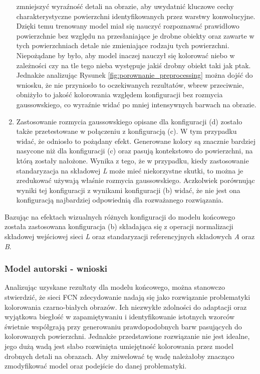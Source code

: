\begin{enumerate}[label=(\alph*)]
    zmniejszyć wyraźność detali na obrazie, aby uwydatnić kluczowe cechy charakterystyczne
    powierzchni identyfikowanych przez warstwy konwolucyjne. Dzięki temu trenowany
    model miał się nauczyć rozpoznawać prawidłowo powierzchnie bez względu na
    przesłaniające je drobne obiekty oraz zawarte w tych powierzchniach detale
    nie zmieniające rodzaju tych powierzchni. Niepożądane by było,
    aby model inaczej nauczył się kolorować niebo w zależności czy na tle tego
    nieba występuje jakiś drobny obiekt taki jak ptak. Jednakże analizując
    Rysunek \ref{fig:porownanie_preprocessing} można dojść do wniosku, że nie
    przyniosło to oczekiwanych rezultatów, wbrew przeciwnie, obniżyło to jakość
    kolorowania względem konfiguracji bez rozmycia gaussowskiego, co wyraźnie
    widać po mniej intensywnych barwach na obrazie.
    \item Zastosowanie rozmycia gaussowskiego opisane dla konfiguracji (d)
    zostało także przetestowane w połączeniu z konfiguracją (c). W tym
    przypadku widać, że odniosło to pożądany efekt. Generowane kolory są znacznie
    bardziej nasycone niż dla konfiguracji (c) oraz pasują kontekstowo do
    powierzchni, na którą zostały nałożone. Wynika z tego, że w przypadku, kiedy zastosowanie
    standaryzacja na składowej \textit{L} może mieć niekorzystne skutki, to
    można je zredukować używają właśnie rozmycia gaussowskiego. Aczkolwiek
    porównując wyniki tej konfiguracji z wynikami konfiguracji (b) widać, że
    nie jest ona konfiguracją najbardziej odpowiednią dla rozważanego
    rozwiązania.
  \end{enumerate}

  \noindent
  Bazując na efektach wizualnych różnych konfiguracji do modelu końcowego
  została zastosowana konfiguracja (b) składająca się z operacji
  normalizacji składowej wejściowej sieci \textit{L} oraz standaryzacji
  referencyjnych składowych \textit{A} oraz \textit{B}.

  \subsubsection{Model autorski - wnioski}

  Analizując uzyskane rezultaty dla modelu końcowego, można stanowczo
  stwierdzić, że sieci FCN zdecydowanie nadają się jako rozwiązanie problematyki kolorowania
  czarno-białych obrazów. Ich niezwykłe zdolności do adaptacji oraz wyjątkowa
  biegłość w zapamiętywaniu i identyfikowanie istotnych wzorców świetnie współgrają
  przy generowaniu prawdopodobnych barw pasujących do kolorowanych powierzchni.
  Jednakże przedstawione rozwiązanie nie jest idealne, jego dużą wadą jest
  słabo rozwinięta umiejętność kolorowania przez model drobnych detali na obrazach.
  Aby zniwelować tę wadę należałoby znacząco zmodyfikować model oraz podejście do
  danej problematyki.

